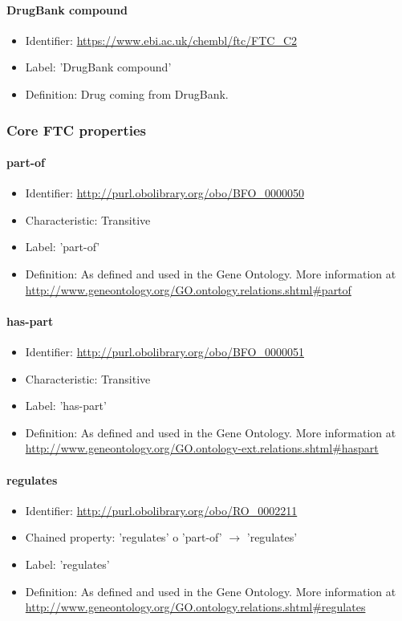 \paragraph{DrugBank compound}
\begin{itemize}
  \item Identifier: \url{https://www.ebi.ac.uk/chembl/ftc/FTC\_C2}
  \item Label: 'DrugBank compound'
  \item Definition: Drug coming from DrugBank.
\end{itemize}

\subsubsection{Core FTC properties}

\paragraph{part-of}
\begin{itemize}
  \item Identifier: \url{http://purl.obolibrary.org/obo/BFO\_0000050}
  \item Characteristic: Transitive
  \item Label: 'part-of'
  \item Definition: As defined and used in the Gene Ontology. More information at \url{http://www.geneontology.org/GO.ontology.relations.shtml\#partof}
\end{itemize}

\paragraph{has-part}
\begin{itemize}
  \item Identifier: \url{http://purl.obolibrary.org/obo/BFO\_0000051}
  \item Characteristic: Transitive
  \item Label: 'has-part'
  \item Definition: As defined and used in the Gene Ontology. More information at \url{http://www.geneontology.org/GO.ontology-ext.relations.shtml\#haspart}
\end{itemize}

\paragraph{regulates}
\begin{itemize}
  \item Identifier: \url{http://purl.obolibrary.org/obo/RO\_0002211}
  \item Chained property: 'regulates' o 'part-of' $ \rightarrow $ 'regulates'
  \item Label: 'regulates'
  \item Definition: As defined and used in the Gene Ontology. More information at \url{http://www.geneontology.org/GO.ontology.relations.shtml\#regulates}
\end{itemize}

